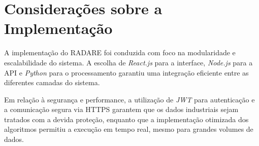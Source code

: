 \section{Considerações sobre a Implementação}
\label{Sec:ConsideracoesImplementacao}

A implementação do RADARE foi conduzida com foco na modularidade e escalabilidade do sistema. A escolha de \textit{React.js} para a interface, \textit{Node.js} para a API e \textit{Python} para o processamento garantiu uma integração eficiente entre as diferentes camadas do sistema.

Em relação à segurança e performance, a utilização de \textit{JWT} para autenticação e a comunicação segura via HTTPS garantem que os dados industriais sejam tratados com a devida proteção, enquanto que a implementação otimizada dos algoritmos permitiu a execução em tempo real, mesmo para grandes volumes de dados.
